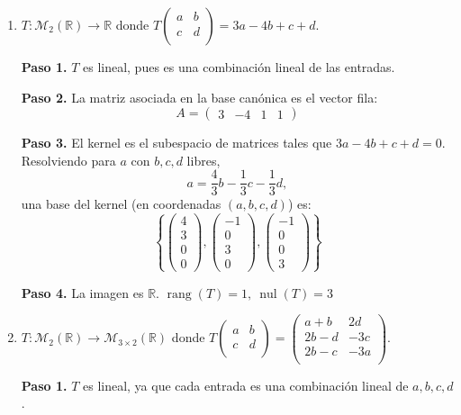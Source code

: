 \begin{prob}
\begin{enumerate}[$a)$]
\begin{myproof}
\textbf{Paso 4.} La imagen es $\{\mathbf{O}\}$. $\boxed{\operatorname{rang}(T)=0,\ \operatorname{nul}(T)=4}$
\end{myproof}

\item $T:\mathcal{M}_{2}\left(\mathbb{R}\right) \rightarrow \mathbb{R}$ donde $T\left( \begin{array}{cc} 
	a&b \\
	c&d\\
	\end{array} \right)= 3a-4b+c+d.$
\begin{myproof}
\textbf{Paso 1.} $T$ es lineal, pues es una combinación lineal de las entradas.

\textbf{Paso 2.} La matriz asociada en la base canónica es el vector fila:
\[
A = \begin{pmatrix} 3 & -4 & 1 & 1 \end{pmatrix}
\]

\textbf{Paso 3.} El kernel es el subespacio de matrices tales que $3a-4b+c+d=0$. Resolviendo para $a$ con $b, c, d$ libres,
\[
a = \frac{4}{3}b - \frac{1}{3}c - \frac{1}{3}d,
\]
una base del kernel (en coordenadas $(a,b,c,d)$) es:
\[
\left\{
\begin{pmatrix}4\\3\\0\\0\end{pmatrix},
\begin{pmatrix}-1\\0\\3\\0\end{pmatrix},
\begin{pmatrix}-1\\0\\0\\3\end{pmatrix}
\right\}
\]

\textbf{Paso 4.} La imagen es $\mathbb{R}$. $\boxed{\operatorname{rang}(T)=1,\ \operatorname{nul}(T)=3}$
\end{myproof}

\item $T:\mathcal{M}_{2}\left(\mathbb{R}\right) \rightarrow \mathcal{M}_{3\times 2}\left(\mathbb{R}\right)$ donde $T\left( \begin{array}{cc} 
	a&b \\
	c&d\\
	\end{array} \right)= \left( \begin{array}{cc} 
	a+b& 2d \\
	2b-d&-3c\\
	2b-c&-3a\\
	\end{array} \right).$
\begin{myproof}
\textbf{Paso 1.} $T$ es lineal, ya que cada entrada es una combinación lineal de $a, b, c, d$.


\end{myproof}
\end{enumerate}
\end{prob}
